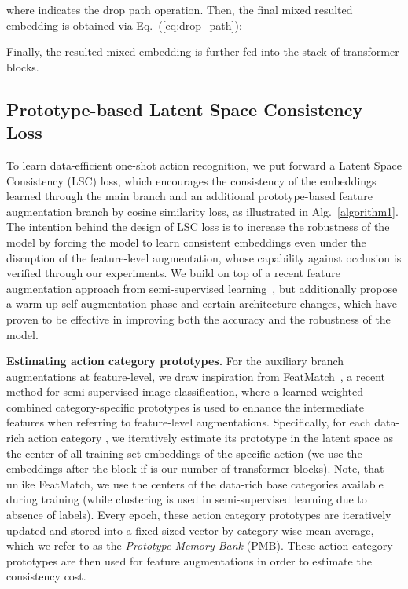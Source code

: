 \documentclass[lettersize,journal]{IEEEtran}
\begin{document}
where  indicates the drop path operation. Then, the final mixed resulted embedding  is obtained via Eq.~(\ref{eq:drop_path}):

Finally, the resulted mixed embedding is further fed into the stack of transformer blocks.

\subsection{Prototype-based Latent Space Consistency Loss}
\label{sec:prototype_loss}
To learn data-efficient one-shot action recognition, we put forward a Latent Space Consistency (LSC) loss, which encourages the consistency of the embeddings learned through the main branch and an additional prototype-based feature augmentation branch by cosine similarity loss, as illustrated in Alg.~\ref{algorithm1}.
The intention behind the design of LSC loss is to increase the robustness of the model by forcing the model to learn consistent embeddings even under the disruption of the feature-level augmentation, whose capability against occlusion is verified through our experiments.
We build on top of a recent feature augmentation approach from semi-supervised learning~\cite{kuo2020featmatch}, but additionally propose a warm-up self-augmentation phase and certain architecture changes, which have proven to be effective in improving both the accuracy and the robustness of the model.

\noindent\textbf{Estimating action category prototypes.} 
For the auxiliary branch augmentations at feature-level, we draw inspiration from FeatMatch~\cite{kuo2020featmatch}, a recent method for semi-supervised image classification, where a learned weighted combined category-specific prototypes is used to enhance the intermediate features when referring to feature-level augmentations.
Specifically, for each data-rich action category , we iteratively estimate its prototype in the latent space as the center of all training set embeddings of the specific action (we use the embeddings after the  block if  is our number of transformer blocks).
Note, that unlike FeatMatch, we use the centers of the data-rich base categories available during training (while clustering is used in semi-supervised learning due to absence of labels). 
Every epoch, these action category prototypes are iteratively updated and stored into a fixed-sized vector by category-wise mean average, which we refer to as the \textit{Prototype Memory Bank} (PMB).
These action category prototypes are then used for feature augmentations in order to estimate the consistency cost. 
\end{document}
